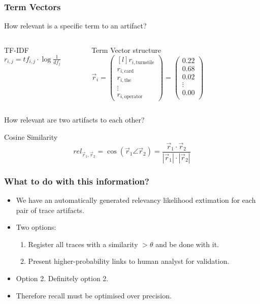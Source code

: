 \documentclass{beamer}
\begin{document}
\begin{frame}
\frametitle{Term Vectors}
How relevant is a specific term to an artifact?

\begin{columns}[t]
\begin{block}{TF-IDF}
\(
r_{i,j} = tf_{i,j}\cdot\log\frac{1}{df_j}
\)
\end{block}

\pause

\begin{block}{Term Vector structure}
\(
\vec{r}_i=
\begin{pmatrix*}[l]
  r_{i,\text{turnstile}}\\
  r_{i,\text{card}}\\
  r_{i,\text{the}}\\
  \vdots\\
  r_{i,\text{operator}}
\end{pmatrix*}
=
\begin{pmatrix}
  0.22\\
  0.68\\
  0.02\\
  \vdots\\
  0.00\\
\end{pmatrix}
\)
\end{block}

\end{columns}

\vfill
\pause
How relevant are two artifacts to each other?

\begin{block}{Cosine Similarity}
  \[ rel_{\vec r_1, \vec r_2} = \cos(\vec r_1 \angle \vec r_2)
  = \frac{\vec r_1 \cdot \vec r_2}{|\vec r_1| \cdot |\vec r_2| } \]
\end{block}

\end{frame}

\begin{frame}
\frametitle{What to do with this information?}
\begin{itemize}
\item We have an automatically generated relevancy likelihood extimation for each pair of trace artifacts.
\item Two options:
  \begin{enumerate}
  \item Register all traces with a similarity $>\theta$ and be done with it.
  \item Present higher-probability links to human analyst for validation.
  \end{enumerate}
\item Option 2. Definitely option 2.
\item Therefore recall must be optimised over precision.
\end{itemize}
\end{frame}
\end{document}
